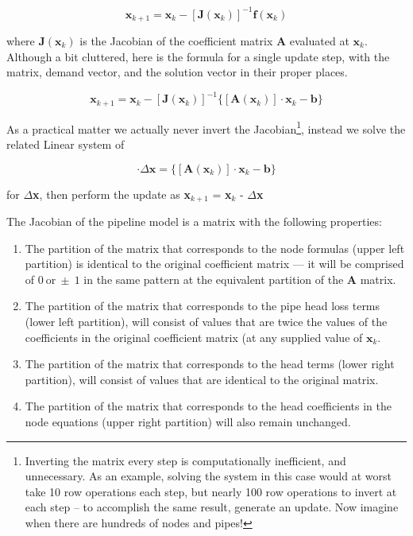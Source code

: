 \begin{equation}
\mathbf{x}_{k+1}=\mathbf{x}_{k} - [\mathbf{J}(\mathbf{x}_{k})]^{-1} \mathbf{f}(\mathbf{x}_k) 
\end{equation}

where
$\mathbf{J}(\mathbf{x}_{k})$ is the Jacobian of the coefficient matrix $\mathbf{A}$ evaluated at $\mathbf{x}_{k}$.   Although a bit cluttered, here is the formula for a single update step, with the matrix, demand vector, and the solution vector in their proper places.

\begin{equation}
\mathbf{x}_{k+1}=\mathbf{x}_{k} - [\mathbf{J}(\mathbf{x}_{k})]^{-1} \{[\mathbf{A}(\mathbf{x}_k)] \cdot \mathbf{x}_k - \mathbf{b}\}
\end{equation}

As a practical matter we actually never invert the Jacobian\footnote{Inverting the matrix every step is computationally inefficient, and unnecessary.  As an example, solving the system in this case would at worst take 10 row operations each step, but nearly 100 row operations to invert at each step -- to accomplish the same result, generate an update.  Now imagine when there are hundreds of nodes and pipes!}, instead we solve the related Linear system of 

\begin{equation}
 [\mathbf{J}(\mathbf{x}_{k})] \cdot \Delta \mathbf{x} = \{[\mathbf{A}(\mathbf{x}_k)] \cdot \mathbf{x}_k - \mathbf{b}\}
\end{equation}

for $\Delta$\textbf{x}, then perform the update as \textbf{x}$_{k+1}$ = \textbf{x}$_{k}$ - $\Delta$\textbf{x}

The Jacobian of the pipeline model is a matrix with the following properties:
\begin{enumerate}
\item The partition of the matrix that corresponds to the node formulas (upper left partition) is identical to the original coefficient matrix --- it will be comprised of $0~\text{or}~\pm~1$ in the same pattern at the equivalent partition of the $\mathbf{A}$ matrix.
\item The partition of the matrix that corresponds to the pipe head loss terms (lower left partition), will consist of values that are twice the values of the coefficients in the original coefficient matrix (at any supplied value of $\mathbf{x}_k$.
\item The partition of the matrix that corresponds to the head terms (lower right partition), will consist of values that are identical to the original matrix. 
\item The partition of the matrix that corresponds to the head coefficients in the node equations (upper right partition) will also remain unchanged.
\end{enumerate}

